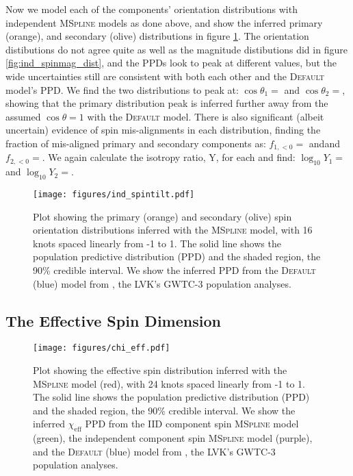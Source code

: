 Now we model each of the components' orientation distributions with independent \textsc{MSpline} models as done above, and show the inferred 
primary (orange), and secondary (olive) distributions in figure \ref{fig:ind_spintilt_dist}. The orientation distibutions do not agree quite as well as 
the magnitude distibutions did in figure \ref{fig:ind_spinmag_dist}, and the PPDs look to peak at different values, but the wide uncertainties still are 
consistent with both each other and the \textsc{Default} model's PPD. We find the two distributions to peak at: $\cos{\theta_1}=$\result{$\CIPlusMinus{\macros[MSplineIndependentCompSpins][peakCosTilt1]}$} 
and $\cos{\theta_2}=$\result{$\CIPlusMinus{\macros[MSplineIndependentCompSpins][peakCosTilt2]}$}, showing that the primary distribution peak is inferred further away 
from the assumed $\cos{\theta}=1$ with the \textsc{Default} model. There is also significant (albeit uncertain) evidence of spin mis-alignments in each distribution, finding 
the fraction of mis-aligned primary and secondary components as: $f_{1,<0}=$\result{$\CIPlusMinus{\macros[MSplineIndependentCompSpins][negFrac1]}$} andand $f_{2,<0}=$\result{$\CIPlusMinus{\macros[MSplineIndependentCompSpins][negFrac2]}$}.
We again calculate the isotropy ratio, Y, for each and find: $\log_{10}Y_1=$ and 
$\log_{10}Y_2=$.

\begin{figure}
        \texttt{[image: figures/ind\_spintilt.pdf]}
        \caption{Plot showing the primary (orange) and secondary (olive) spin orientation distributions inferred with the \textsc{MSpline} model, 
        with 16 knots spaced linearly from -1 to 1. The solid line shows the population predictive distribution (PPD) and the shaded region, the 90\% credible interval. 
        We show the inferred PPD from the \textsc{Default} (blue) model from \citet{o3b_astro_dist}, the LVK's GWTC-3 population analyses.}
        \label{fig:ind_spintilt_dist}
\end{figure}

\subsection{The Effective Spin Dimension}

\begin{figure}
    \texttt{[image: figures/chi\_eff.pdf]}
    \caption{Plot showing the effective spin distribution inferred with the \textsc{MSpline} model (red), with 24 knots spaced linearly from -1 to 1. 
    The solid line shows the population predictive distribution (PPD) and the shaded region, the 90\% credible interval. We show the inferred $\chi_\mathrm{eff}$ 
    PPD from the IID component spin \textsc{MSpline} model (green), the independent component spin \textsc{MSpline} model (purple), 
    and the \textsc{Default} (blue) model from \citet{o3b_astro_dist}, the LVK's GWTC-3 population analyses.}
    \label{fig:chieff_dist}
\end{figure}

